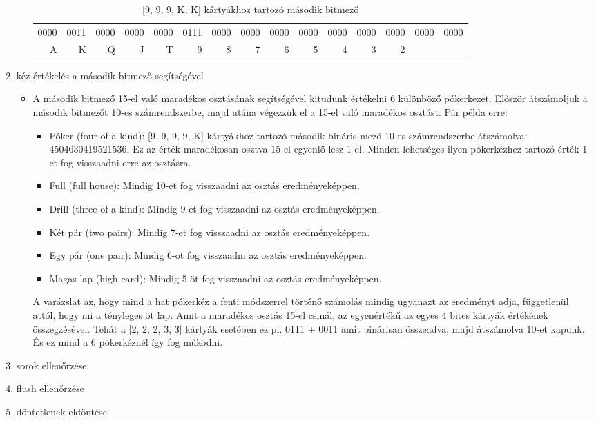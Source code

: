 \documentclass[]{thesis-ekf}
\theoremstyle{definition}
\theoremstyle{remark}
\begin{document}
\begin{enumerate}
\begin{itemize}
		\begin{table}[ht!]
			\centering
			\footnotesize
			\begin{tabular}{*{15}{r}}
				0000 & 0011 & 0000 & 0000 & 0000 & 0111 & 0000 & 0000 & 0000 & 0000 & 0000 & 0000 & 0000 & 0000 & 0000\\
				A & K & Q & J & T & 9 & 8 & 7 & 6 & 5 & 4 & 3 & 2
			\end{tabular}
			\caption{[9, 9, 9, K, K] kártyákhoz tartozó második bitmező}
			\label{tab-bitfieldcounts2}
		\end{table}
		
	\end{itemize}
	\item kéz értékelés a második bitmező segítségével
	\begin{itemize}
		\item A második bitmező 15-el való maradékos osztásának segítségével kitudunk értékelni 6 különböző pókerkezet. Először átszámoljuk a második bitmezőt 10-es számrendszerbe, majd utána végezzük el a 15-el való maradékos osztást. Pár példa erre:
		\begin{itemize}
			\item Póker (four of a kind): [9, 9, 9, 9, K]
			kártyákhoz tartozó második bináris mező 10-es számrendszerbe átszámolva: 4504630419521536. Ez az érték maradékosan osztva 15-el egyenlő lesz 1-el. Minden lehetséges ilyen pókerkézhez tartozó érték 1-et fog visszaadni erre az osztásra.
			\item Full (full  house): Mindig 10-et fog visszaadni az osztás eredményeképpen.
			\item Drill (three of a kind): Mindig 9-et fog visszaadni az osztás eredményeképpen.
			\item Két pár (two pairs): Mindig 7-et fog visszaadni az osztás eredményeképpen.
			\item Egy pár (one pair): Mindig 6-ot fog visszaadni az osztás eredményeképpen.
			\item Magas lap (high card): Mindig 5-öt fog visszaadni az osztás eredményeképpen.
		\end{itemize}
		
		A varázslat az, hogy mind a hat pókerkéz a fenti módszerrel történő számolás mindig ugyanazt az eredményt adja, függetlenül attól, hogy mi a tényleges öt lap. Amit a maradékos osztás 15-el csinál, az egyenértékű az egyes 4 bites kártyák értékének összegzésével. Tehát a [2, 2, 2, 3, 3] kártyák esetében ez pl. 0111 + 0011 amit binárisan összeadva, majd átszámolva 10-et kapunk. És ez mind a 6 pókerkéznél így fog működni.
		
	\end{itemize}
	\item sorok ellenőrzése
	\item flush ellenőrzése
	\item döntetlenek eldöntése
\end{enumerate}
\end{document}
